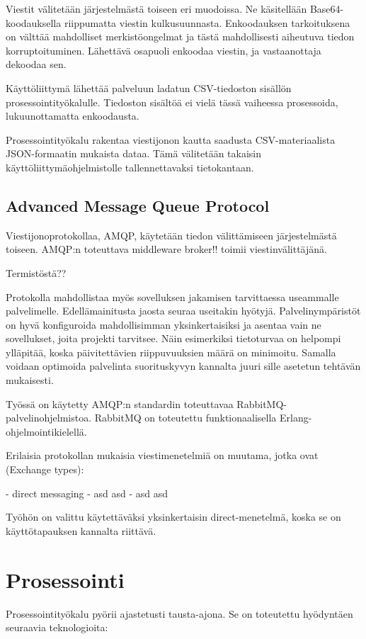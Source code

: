 \documentclass[11pt,a4paper,oneside]{memoir}
\begin{document}
Viestit välitetään järjestelmästä toiseen eri muodoissa. Ne käsitellään Base64-koodauksella riippumatta viestin kulkusuunnasta. Enkoodauksen tarkoituksena on välttää mahdolliset merkistöongelmat ja tästä mahdollisesti aiheutuva tiedon korruptoituminen. Lähettävä osapuoli enkoodaa viestin, ja vastaanottaja dekoodaa sen.

Käyttöliittymä lähettää palveluun ladatun CSV-tiedoston sisällön prosessointityökalulle. Tiedoston sisältöä ei vielä tässä vaiheessa prosessoida, lukuunottamatta enkoodausta.

Prosessointityökalu rakentaa viestijonon kautta saadusta CSV-materiaalista JSON-formaatin mukaista dataa. Tämä välitetään takaisin käyttöliittymäohjelmistolle tallennettavaksi tietokantaan. 

\subsection{Advanced Message Queue Protocol\label{topic:amqp}}
Viestijonoprotokollaa, AMQP, käytetään tiedon välittämiseen järjestelmästä toiseen. AMQP:n toteuttava middleware broker!! toimii viestinvälittäjänä.

Termistöstä??

Protokolla mahdollistaa myös sovelluksen jakamisen tarvittaessa useammalle palvelimelle. Edellämainitusta jaosta seuraa useitakin hyötyjä. Palvelinympäristöt on hyvä konfiguroida mahdollisimman yksinkertaisiksi ja asentaa vain ne sovellukset, joita projekti tarvitsee. Näin esimerkiksi tietoturvaa on helpompi ylläpitää, koska päivitettävien riippuvuuksien määrä on minimoitu. Samalla voidaan optimoida palvelinta suorituskyvyn kannalta juuri sille asetetun tehtävän mukaisesti.

Työssä on käytetty AMQP:n standardin toteuttavaa RabbitMQ-palvelinohjelmistoa. RabbitMQ on toteutettu funktionaalisella Erlang-ohjelmointikielellä. 

Erilaisia protokollan mukaisia viestimenetelmiä on muutama, jotka ovat (Exchange types):

- direct messaging
- asd asd
- asd asd 

Työhön on valittu käytettäväksi yksinkertaisin direct-menetelmä, koska se on käyttötapauksen kannalta riittävä.

\section{Prosessointi}
Prosessointityökalu pyörii ajastetusti tausta-ajona. Se on toteutettu hyödyntäen seuraavia teknologioita:
\end{document}
